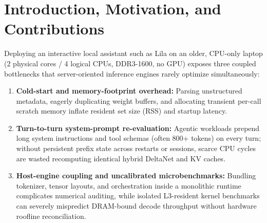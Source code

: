 \documentclass[11pt,a4paper]{article}
\begin{document}
\section{Introduction, Motivation, and Contributions}

Deploying an interactive local assistant such as Lila on an older, CPU-only laptop (2 physical cores / 4 logical CPUs, DDR3-1600, no GPU) exposes three coupled bottlenecks that server-oriented inference engines rarely optimize simultaneously:

\begin{enumerate}
    \item \textbf{Cold-start and memory-footprint overhead:} Parsing unstructured metadata, eagerly duplicating weight buffers, and allocating transient per-call scratch memory inflate resident set size (RSS) and startup latency.
    \item \textbf{Turn-to-turn system-prompt re-evaluation:} Agentic workloads prepend long system instructions and tool schemas (often 800+ tokens) on every turn; without persistent prefix state across restarts or sessions, scarce CPU cycles are wasted recomputing identical hybrid DeltaNet and KV caches.
    \item \textbf{Host-engine coupling and uncalibrated microbenchmarks:} Bundling tokenizer, tensor layouts, and orchestration inside a monolithic runtime complicates numerical auditing, while isolated L3-resident kernel benchmarks can severely mispredict DRAM-bound decode throughput without hardware roofline reconciliation.
\end{enumerate}
\end{document}
